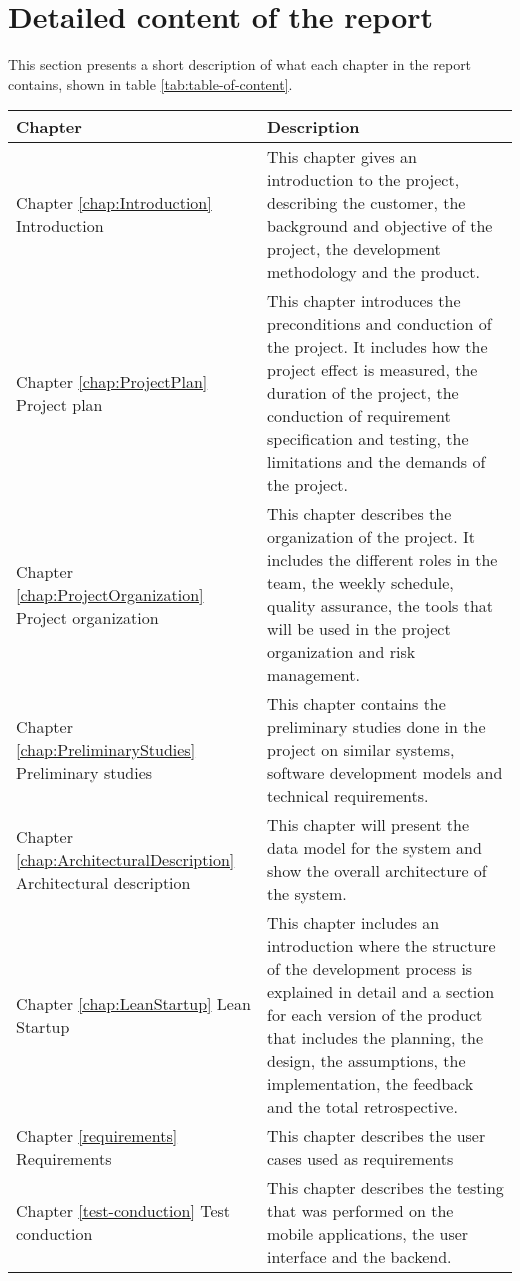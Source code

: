 \section{Detailed content of the report}
This section presents a short description of what each chapter in the report contains, shown in table \ref{tab:table-of-content}. 

\begin{table}[h]
\small
\centering
\begin{tabular}{|L{0.10\textwidth}|L{0.90\textwidth}|}
\hline
Chapter & Description \\
\hline
Chapter \ref{chap:Introduction} Introduction & This chapter gives an introduction to the project, describing the customer, the background and objective of the project, the development methodology and the product. \\
\hline
Chapter \ref{chap:ProjectPlan} Project plan & This chapter introduces the preconditions and conduction of the project. It includes how the project effect is measured, the duration of the project, the conduction of requirement specification and testing, the limitations and the demands of the project. \\
\hline
Chapter \ref{chap:ProjectOrganization} Project organization & This chapter describes the organization of the project. It includes the different roles in the team, the weekly schedule, quality assurance, the tools that will be used in the project organization and risk management. \\
\hline
Chapter \ref{chap:PreliminaryStudies} Preliminary studies & This chapter contains the preliminary studies done in the project on similar systems, software development models and technical requirements. \\
\hline
Chapter \ref{chap:ArchitecturalDescription} Architectural description & This chapter will present the data model for the system and show the overall architecture of the system.  \\
\hline
Chapter \ref{chap:LeanStartup} Lean Startup & This chapter includes an introduction where the structure of the development process is explained in detail and a section for each version of the product that includes the planning, the design, the assumptions, the implementation, the feedback and the total retrospective. \\ 
\hline
Chapter \ref{requirements} Requirements & This chapter describes the user cases used as requirements \\
\hline
Chapter \ref{test-conduction} Test conduction & This chapter describes the testing that was performed on the mobile applications, the user interface and the \gls{backend}. \\

\end{tabular}
\end{table}
